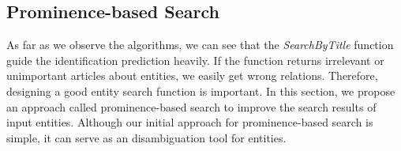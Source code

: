 






\subsection{Prominence-based Search}
\label{sec:prominence}
As far as we observe the algorithms, we can see that the {\em SearchByTitle} function guide the identification prediction heavily. If the function returns irrelevant or unimportant articles about entities, we easily get wrong relations. Therefore, designing a good entity search function is important. In this section, we propose an approach called prominence-based search to improve the search results of input entities. Although our initial approach for prominence-based search is simple, it can serve as an disambiguation tool for entities.


